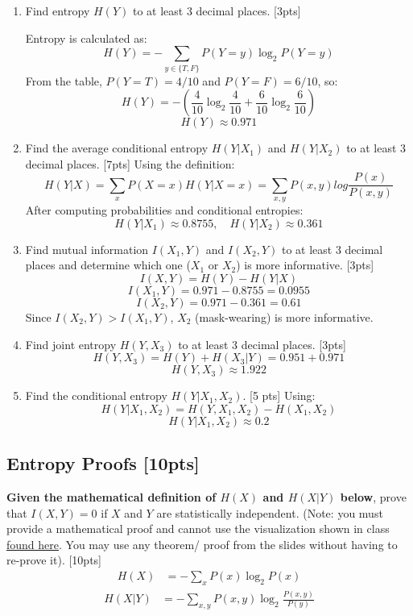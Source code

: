 \documentclass{article}
\begin{document}
\begin{enumerate}[label=(\alph*)]
    \item Find entropy $H(Y)$ to at least 3 decimal places. [3pts]
    
    Entropy is calculated as:
\[
    H(Y) = - \sum_{y \in \{T,F\}} P(Y=y) \log_2 P(Y=y)
\]
From the table, $P(Y=T) = 4/10$ and $P(Y=F) = 6/10$, so:
\[
    H(Y) = -\left(\frac{4}{10} \log_2 \frac{4}{10} + \frac{6}{10} \log_2 \frac{6}{10}\right)
\]
\[
    H(Y) \approx 0.971
\]

    \item Find the average conditional entropy $H(Y|X_1)$ and $H(Y|X_2)$ to at least 3 decimal places. [7pts]
    Using the definition:
\[
    H(Y|X) = \sum_{x} P(X=x) H(Y|X=x) = \sum_{x,y} P(x,y)log\frac{P(x)}{P(x,y)}
\]
After computing probabilities and conditional entropies:
\[
    H(Y|X_1) \approx 0.8755, \quad H(Y|X_2) \approx 0.361
\]

    \item Find mutual information $I(X_1, Y)$ and $I(X_2, Y)$ to at least 3 decimal places and determine which one ($X_1$ or $X_2$) is more informative. [3pts]
    \[
    I(X, Y) = H(Y) - H(Y|X)
\]
\[
    I(X_1, Y) = 0.971 - 0.8755 = 0.0955
\]
\[
    I(X_2, Y) = 0.971 - 0.361 = 0.61 
\]
Since $I(X_2, Y) > I(X_1, Y)$, $X_2$ (mask-wearing) is more informative.

    \item Find joint entropy $H(Y, X_3)$ to at least 3 decimal places. [3pts]
    \[
    H(Y, X_3) = H(Y) + H(X_3|Y) = 0.951 + 0.971
\]
\[
    H(Y, X_3) \approx 1.922
\]

    \item Find the conditional entropy $H(Y|X_1, X_2)$. [5 pts]
    Using:
\[
    H(Y|X_1, X_2) = H(Y, X_1, X_2) - H(X_1, X_2)
\]
\[
    H(Y|X_1, X_2) \approx 0.2
\]

\end{enumerate}

\newpage



\subsection{Entropy Proofs [10pts]}

\textbf{Given the mathematical definition of $H(X)$ and $H(X|Y)$ below}, prove that $I(X,Y) = 0$ if $X$ and $Y$ are statistically independent. (Note: you must provide a mathematical proof and cannot use the visualization shown in class \href{https://mahdi-roozbahani.github.io/CS46417641-summer2022/other/CEandMI_Illustration.jpg}{found here}. You may use any theorem/ proof from the slides without having to re-prove it). [10pts] \\
\newline
\begin{align*}
    H(X) &= -\sum_{x}P(x)\log_2P(x)
\end{align*}
\begin{align*}
    H(X|Y) &= -\sum_{x,y}P(x,y)\log_2\frac{P(x,y)}{P(y)}
\end{align*}
\end{document}
